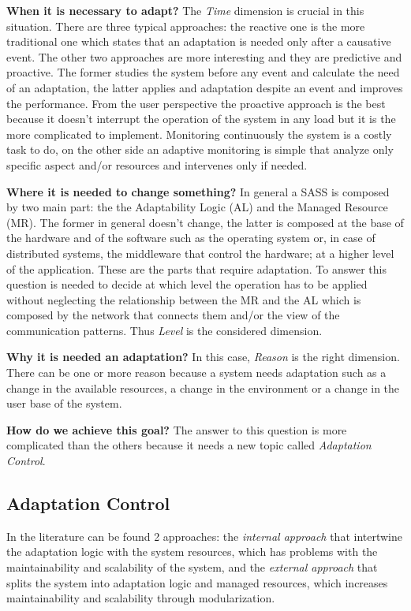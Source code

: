 \textbf{When it is necessary to adapt?} The \emph{Time} dimension is crucial in this situation. There are three typical approaches: the reactive one is the more traditional one which states that an adaptation is needed only after a causative event. The other two approaches are more interesting and they are predictive and proactive. The former studies the system before any event and calculate the need of an adaptation, the latter applies and adaptation despite an event and improves the performance. From the user perspective the proactive approach is the best because it doesn't interrupt the operation of the system in any load but it is the more complicated to implement. Monitoring continuously the system is a costly task to do, on the other side an adaptive monitoring is simple that analyze only specific aspect and/or resources and intervenes only if needed.

\textbf{Where it is needed to change something?} In general a SASS is composed by two main part: the the Adaptability Logic (AL) and the Managed Resource (MR). The former in general doesn't change, the latter is composed at the base of the hardware and of the software such as the operating system or, in case of distributed systems, the middleware that control the hardware; at a higher level of the application. These are the parts that require adaptation. To answer this question is needed to decide at which level the operation has to be applied without neglecting the relationship between the MR and the AL which is composed by the network that connects them and/or the view of the communication patterns. Thus \emph{Level} is the considered dimension.

\textbf{Why it is needed an adaptation?} In this case, \emph{Reason} is the right dimension. There can be one or more reason because a system needs adaptation such as a change in the available resources, a change in the environment or a change in the user base of the system.

\textbf{How do we achieve this goal?} The answer to this question is more complicated than the others because it needs a new topic called \emph{Adaptation Control}.

\subsection{Adaptation Control}
In the literature can be found 2 approaches: the \emph{internal approach} that intertwine the adaptation logic with the system resources, which has problems with the maintainability and scalability of the system, and the \emph{external approach} that splits the system into adaptation logic and managed resources, which increases maintainability and scalability through modularization.

